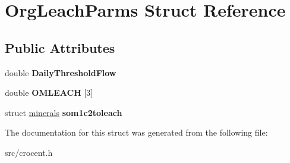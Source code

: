 \hypertarget{struct_org_leach_parms}{\section{Org\-Leach\-Parms Struct Reference}
\label{struct_org_leach_parms}
}
\subsection*{Public Attributes}
\begin{DoxyCompactItemize}
\item 
\hypertarget{struct_org_leach_parms_ad6d2e4859a5f9ee28b55b51e3fee6f7d}{double {\bfseries Daily\-Threshold\-Flow}}\label{struct_org_leach_parms_ad6d2e4859a5f9ee28b55b51e3fee6f7d}

\item 
\hypertarget{struct_org_leach_parms_a3091c466f6379774416dc7dadbf8ed8f}{double {\bfseries O\-M\-L\-E\-A\-C\-H} \mbox{[}3\mbox{]}}\label{struct_org_leach_parms_a3091c466f6379774416dc7dadbf8ed8f}

\item 
\hypertarget{struct_org_leach_parms_a9759c43dff2e30f9ac5b7f6af738c0fb}{struct \hyperlink{structminerals}{minerals} {\bfseries som1c2toleach}}\label{struct_org_leach_parms_a9759c43dff2e30f9ac5b7f6af738c0fb}

\end{DoxyCompactItemize}


The documentation for this struct was generated from the following file\-:\begin{DoxyCompactItemize}
\item 
src/crocent.\-h\end{DoxyCompactItemize}
